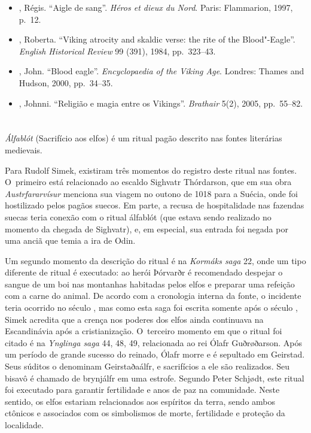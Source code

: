 \begin{itemize}\footnotesize
\item
  , Régis. ``Aigle de sang''. \emph{Héros et dieux du Nord}. Paris:
  Flammarion, 1997, p.~12.
\item
  , Roberta. ``Viking atrocity and skaldic verse: the rite of the
  Blood"-Eagle''. \emph{English Historical Review} 99 (391), 1984, pp.~323--43.
\item
  , John. ``Blood eagle''. \emph{Encyclopaedia of the Viking Age}.
  Londres: Thames and Hudson, 2000, pp.~34--35.
\item
  , Johnni. ``Religião e magia entre os Vikings''. \emph{Brathair}
  5(2), 2005, pp.~55--82.
\end{itemize}

\section{}

\emph{Álfablót} (Sacrifício aos elfos) é um ritual pagão descrito nas
fontes literárias medievais.

Para Rudolf Simek, existiram três momentos do registro deste ritual nas
fontes. O~primeiro está relacionado ao escaldo Sighvatr Thórdarson, que
em sua obra \emph{Austrfararvísur} menciona sua viagem no outono de 1018
para a Suécia, onde foi hostilizado pelos pagãos suecos. Em parte, a
recusa de hospitalidade nas fazendas suecas teria conexão com o ritual
álfablót (que estava sendo realizado no momento da chegada de Sighvatr),
e, em especial, sua entrada foi negada por uma anciã que temia a ira de
Odin.

Um segundo momento da descrição do ritual é na \emph{Kormáks saga} 22,
onde um tipo diferente de ritual é executado: ao herói Þórvarðr é
recomendado despejar o sangue de um boi nas montanhas habitadas pelos
elfos e preparar uma refeição com a carne do animal. De acordo com a
cronologia interna da fonte, o incidente teria ocorrido no século , mas
como esta saga foi escrita somente após o século , Simek acredita
que a crença nos poderes dos elfos ainda continuava na Escandinávia após
a cristianização. O~terceiro momento em que o ritual foi citado é na
\emph{Ynglinga saga} 44, 48, 49, relacionada ao rei Ólafr Guðrøðarson.
Após um período de grande sucesso do reinado, Ólafr morre e é sepultado
em Geirstad. Seus súditos o denominam Geirstaðaálfr, e sacrifícios a ele
são realizados. Seu bisavô é chamado de brynjálfr em uma estrofe.
Segundo Peter Schjødt, este ritual foi executado para garantir
fertilidade e anos de paz na comunidade. Neste sentido, os elfos
estariam relacionados aos espíritos da terra, sendo ambos ctônicos e
associados com os simbolismos de morte, fertilidade e proteção da
localidade.

